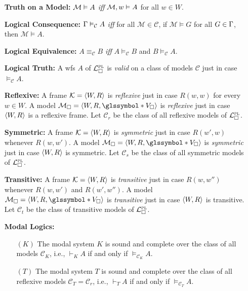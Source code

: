 \documentclass[a4paper, 11pt]{article} %
\newcommand{\g}{\glssymbol*}%
\begin{document}
\begin{enumerate}[leftmargin=1.2in,labelsep=.15in] %
\item[\bf Truth on a Model:] $\mathcal{M}\vDash A$ \textit{iff} $\mathcal{M},w\vDash A$ for all $w\in W$.
\item[\bf Logical Consequence:] $\Gamma\vDash_\mathcal{C} A$ \textit{iff} for all $\mathcal{M}\in\mathcal{C}$, if $\mathcal{M}\vDash G$ for all $G\in\Gamma$, then $\mathcal{M}\vDash  A$.
\item[\bf Logical Equivalence:] $A\equiv_\mathcal{C} B$ \textit{iff} $A\vDash_\mathcal{C} B$ and $B\vDash_\mathcal{C} A$.  
\item[\bf Logical Truth:] A wfs $A$ of $\mathcal{L}^{\textsc{pl}}_\square$ is \textit{valid} on a class of models $\mathcal{C}$ just in case $\vDash_\mathcal{C} A$.%
\item[\bf Reflexive:] A frame $\mathcal{K}=\langle W,R\rangle$ is \textit{reflexive} just in case $R(w,w)$ for every $w\in W$. A model $\mathcal{M}_\square=\tuple{W,R,\g{V}_\square}$ is \textit{reflexive} just in case $\langle W,R\rangle$ is a reflexive frame. Let $\mathcal{C}_r$ be the class of all reflexive models of $\mathcal{L}^{\textsc{pl}}_\square$.
\item[\bf Symmetric:] A frame $\mathcal{K}=\langle W,R\rangle$ is \textit{symmetric} just in case $R(w',w)$ whenever $R(w,w')$. A model $\mathcal{M}_\square=\tuple{W,R,\g{V}_\square}$ is \textit{symmetric} just in case $\langle W,R\rangle$ is symmetric. Let $\mathcal{C}_s$ be the class of all symmetric models of $\mathcal{L}^{\textsc{pl}}_\square$.
\item[\bf Transitive:] A frame $\mathcal{K}=\langle W,R\rangle$ is \textit{transitive} just in case $R(w,w'')$ whenever $R(w,w')$ and $R(w',w'')$. A model $\mathcal{M}_\square=\tuple{W,R,\g{V}_\square}$ is \textit{transitive} just in case $\langle W,R\rangle$ is transitive. Let $\mathcal{C}_t$ be the class of transitive models of $\mathcal{L}^{\textsc{pl}}_\square$.
\item[\bf Modal Logics:]
	\begin{enumerate}
	\item[$(K)$] The modal system $K$ is sound and complete over the class of all models $\mathcal{C}_K$, i.e., $\vdash_K A$ if and only if $\vDash_{\mathcal{C}_K} A$.
	\item[$(T)$] The modal system $T$ is sound and complete over the class of all reflexive models $\mathcal{C}_T=\mathcal{C}_r$, i.e., $\vdash_T A$ if and only if $\vDash_{\mathcal{C}_T} A$.

\end{enumerate}
\end{enumerate}
\end{document}

